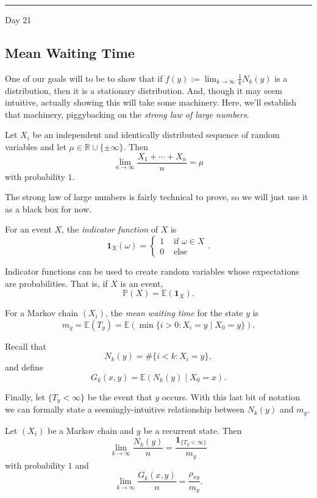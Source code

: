 \documentclass{problemset}
\newcommand{\R}{\mathbb{R}}
\newcommand{\E}{\mathbb{E}}
\newcommand{\1}{\mathbf{1}}
\renewcommand{\P}{\mathbb{P}}
\newcommand{\fatrule}[1]{\vspace{.3cm}\hrule {\hfill \sf #1}\par}
\begin{document}
	\fatrule{Day 21}

	\subsection*{Mean Waiting Time}

	One of our goals will to be to show that if 
		$f(y) := \lim_{k\to\infty} \frac{1}{k} N_k(y)$ is a distribution, then it is
		a stationary distribution.  And, though it may seem intuitive, actually
		showing this will take some machinery.  Here, we'll establish that machinery,
		piggybacking on the \emph{strong law of large numbers}.

	\begin{theorem}
		Let $X_i$ be an independent and identically distributed sequence of random
		variables and let $\mu\in\R\cup\{\pm\infty\}$.  Then
		\[
			\lim_{n\to\infty} \frac{X_1+\cdots +X_n}{n} = \mu
		\]
		with probability $1$.
	\end{theorem}

	The strong law of large numbers is fairly technical to prove, so we will
	just use it as a black box for now.

	\begin{definition}
		For an event $X$, the \emph{indicator function} of $X$ is 
		\[
			\1_{X}(\omega) = \begin{cases}
				1&\text{ if }\omega\in X\\
				0&\text{ else}
			\end{cases}.
		\]
	\end{definition}

	Indicator functions can be used to create random variables whose expectations
	are probabilities.  That is, if $X$ is an event,
	\[
		\P(X) = \E(\1_{X}).
	\]

	\begin{definition}
		For a Markov chain $(X_i)$, the \emph{mean waiting time} for the state $y$ is
		\[
			m_y=\E(T_y) = \E(\min\{i>0: X_i=y\mid X_0=y\}).
		\]
	\end{definition}

	Recall that
	\[
		N_k(y) = \#\{i< k:X_i=y\},
	\]
	and define
	\[
		G_k(x,y) = \E(N_k(y)\mid X_0=x).
	\]

	Finally, let $\{T_y<\infty\}$ be the event that $y$ occurs.  With this
	last bit of notation we can formally state a seemingly-intuitive relationship
	between $N_k(y)$ and $m_y$.

	\begin{theorem}
		Let $(X_i)$ be a Markov chain and $y$ be a recurrent state.
		Then
		\[
			\lim_{k\to\infty} \frac{N_k(y)}{n} = \frac{\1_{\{T_y<\infty\}}}{m_y}
		\]
		with probability $1$ and
		\[
			\lim_{k\to\infty} \frac{G_k(x,y)}{n} = \frac{\rho_{xy}}{m_y}.
		\]
	\end{theorem}
\end{document}
